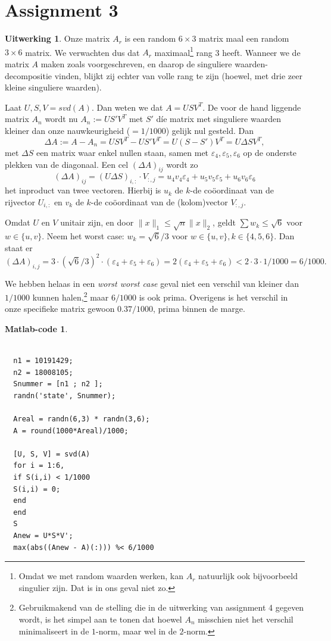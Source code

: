 \documentclass[11pt]{amsart}
\theoremstyle{definition}
\newtheorem*{uitwerking}{Uitwerking}
\newtheorem*{matlab}{Matlab-code}
\newcommand{\e}{\varepsilon}
\begin{document}
\section*{Assignment 3}
\begin{uitwerking}
  Onze matrix $A_r$ is een random $6 \times 3$ matrix maal een random $3 \times 6$ matrix. We verwachten dus dat $A_r$ maximaal\footnote{Omdat we met random waarden werken, kan $A_r$ natuurlijk ook bijvoorbeeld singulier zijn. Dat is in ons geval niet zo.} rang 3 heeft. Wanneer we de matrix $A$ maken zoals voorgeschreven, en daarop de singuliere waarden-decompositie vinden, blijkt zij echter van volle rang te zijn (hoewel, met drie zeer kleine singuliere waarden).

  Laat $U, S, V = svd(A)$. Dan weten we dat $A = U S V^T$. De voor de hand liggende matrix $A_n$ wordt nu $A_n := U S' V^T$ met $S'$ d\'ie matrix met singuliere waarden kleiner dan onze nauwkeurigheid ($= 1/1000$) gelijk nul gesteld. Dan
  \[
  \Delta A := A - A_n = U S V^T - U S' V^T = U(S - S')V^T = U \Delta S V^T,
  \]
  met $\Delta S$ een matrix waar enkel nullen staan, samen met $\e_4, \e_5, \e_6$ op de onderste plekken van de diagonaal. Een cel $(\Delta A)_{ij}$ wordt zo
  \[
  (\Delta A)_{ij} = (U \Delta S)_{i,:} \cdot V_{:,j} = u_4 v_4 \e_4 + u_5 v_5 \e_5 + u_6 v_6 \e_6
  \]
  het inproduct van twee vectoren. Hierbij is $u_k$ de $k$-de co\"oordinaat van de rijvector $U_{i,:}$ en $v_k$ de $k$-de co\"oordinaat van de (kolom)vector $V_{:,j}$.

  Omdat $U$ en $V$ unitair zijn, en door $\|x \|_1 \leq \sqrt{n} \|x\|_2$, geldt $\sum w_k \leq \sqrt{6}$ voor $w \in \{u, v\}$. Neem het worst case: $w_k = \sqrt{6}/3$ voor $w \in \{u, v\}, k \in \{4, 5, 6\}$. Dan staat er
  \[
  (\Delta A)_{i,j} = 3 \cdot (\sqrt{6}/3)^2 \cdot (\e_4 + \e_5 + \e_6) = 2 (\e_4 + \e_5 + \e_6) < 2 \cdot 3 \cdot 1/1000 = 6/1000.
  \]

  We hebben helaas in een \emph{worst worst case} geval niet een verschil van kleiner dan $1/1000$ kunnen halen,\footnote{Gebruikmakend van de stelling die in de uitwerking van assignment 4 gegeven wordt, is het simpel aan te tonen dat hoewel $A_n$ misschien niet het verschil minimaliseert in de $1$-norm, maar wel in de $2$-norm.} maar $6/1000$ is ook prima. Overigens is het verschil in onze specifieke matrix gewoon $0.37/1000$, prima binnen de marge.
\end{uitwerking}
\begin{matlab}~

\begin{verbatim}

  n1 = 10191429;
  n2 = 18008105;
  Snummer = [n1 ; n2 ];
  randn('state', Snummer);

  Areal = randn(6,3) * randn(3,6);
  A = round(1000*Areal)/1000;

  [U, S, V] = svd(A)
  for i = 1:6,
  if S(i,i) < 1/1000
  S(i,i) = 0;
  end
  end
  S
  Anew = U*S*V';
  max(abs((Anew - A)(:))) %< 6/1000
\end{verbatim}
\end{matlab}
\end{document}
